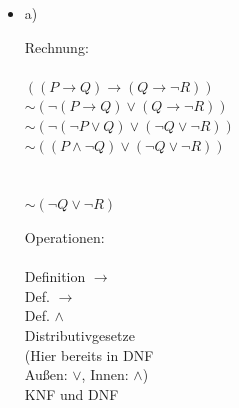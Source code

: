 \documentclass[a4paper]{scrartcl}
\begin{document}
\begin{itemize}
    \item a)\\
        \begin{minipage}[t]{0.55\textwidth}
            Rechnung:\\
            \\
            $((P \rightarrow Q) \rightarrow (Q \rightarrow \neg R))$\\
            $\sim (\neg (P \rightarrow Q) \lor (Q \rightarrow \neg R))$\\
            $\sim (\neg (\neg P \lor Q) \lor (\neg Q \lor \neg R))$\\
            $\sim ((P \land \neg Q) \lor (\neg Q \lor \neg R))$\\
            \\
            \\
            $\sim (\neg Q \lor \neg R)$\\
        \end{minipage}
        \begin{minipage}[t]{0.4\textwidth}
            Operationen:\\
            \\
            Definition $\rightarrow$\\
            Def. $\rightarrow$\\
            Def. $\land$\\
            Distributivgesetze\\
            (Hier bereits in DNF\\
            Außen: $\lor$, Innen: $\land$)\\
            KNF und DNF

        \end{minipage}

\newpage


\end{itemize}
\end{document}
